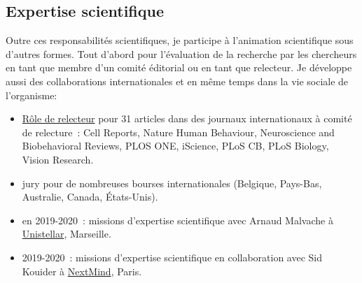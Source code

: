 \documentclass[10pt,french,a4paper,oneside]{article}%
\begin{document}
\subsection{Expertise scientifique} %


Outre ces responsabilités scientifiques, je participe à l'animation scientifique sous d'autres formes. Tout d'abord pour l'évaluation de la recherche par les chercheurs en tant que membre d'un comité éditorial ou en tant que relecteur. Je développe aussi des collaborations internationales et en même temps dans la vie sociale de l'organisme:

\begin{itemize}
	\item \href{https://orcid.org/my-orcid?orcid=0000-0002-9536-010X}{Rôle de relecteur} pour 31 articles dans des journaux internationaux à comité de relecture~: Cell Reports, Nature Human Behaviour, Neuroscience and Biobehavioral Reviews, PLOS ONE, iScience, PLoS CB, PLoS Biology, Vision Research.

	\item jury pour de nombreuses bourses internationales (Belgique, Pays-Bas, Australie, Canada, États-Unis).

	\item en 2019-2020~: missions d'expertise scientifique avec Arnaud Malvache à \href{https://unistellaroptics.com/}{Unistellar}, Marseille.

	\item 2019-2020~: missions d'expertise scientifique en collaboration avec Sid Kouider à \href{https://www.next-mind.com/}{NextMind}, Paris.
\end{itemize}

\printbibliography
\end{document}
